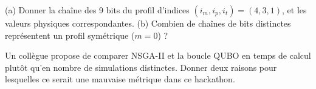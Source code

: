 \exercices
\begin{exercice}
(a) Donner la chaîne des 9 bits du profil d'indices $(i_m,i_p,i_t)=(4,3,1)$, et les valeurs physiques correspondantes. (b) Combien de chaînes de bits distinctes représentent un profil symétrique ($m=0$) ?
\end{exercice}
\begin{exercice}
Un collègue propose de comparer NSGA-II et la boucle QUBO en temps de calcul plutôt qu'en nombre de simulations distinctes. Donner deux raisons pour lesquelles ce serait une mauvaise métrique dans ce hackathon.
\end{exercice}
